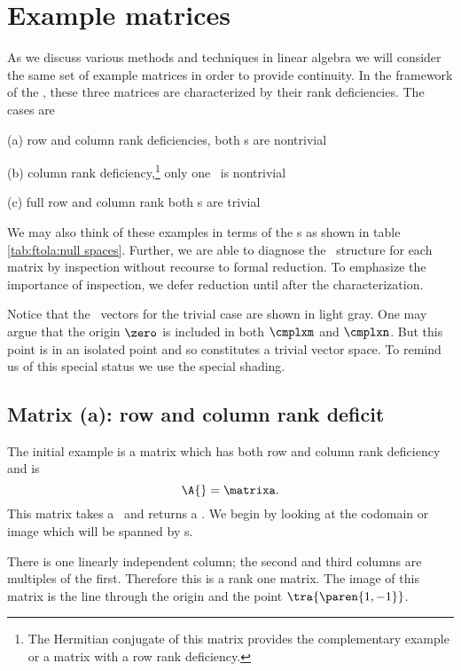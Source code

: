 \section{Example matrices}
As we discuss various methods and techniques in linear algebra we will consider the same set of example matrices in  order to provide continuity. In the framework of the \ft, these three matrices are characterized by their rank deficiencies. The cases are
%
\begin{description}
%
\item{(a)} row and column rank deficiencies,
\subitem both \ns s are nontrivial
%
\item{(b)} column rank deficiency,\footnote{The Hermitian conjugate of this matrix provides the complementary example or a matrix with a row rank deficiency.}
\subitem only one \ns \ is nontrivial
%
\item{(c)} full row and column rank
\subitem both \ns s are trivial
%
\end{description}

We may also think of these examples in terms of the \ns s as shown in table \eqref{tab:ftola:null spaces}.
Further, we are able to diagnose the \ns \ structure for each matrix by inspection without recourse to formal reduction. To emphasize the importance of inspection, we defer reduction until after the characterization.


Notice that the \ns \ vectors for the trivial case are shown in light gray. One may argue that the origin $\zero$ is included in both $\cmplxm$ and $\cmplxn$. But this point is in an isolated point and so constitutes a trivial vector space. To remind us of this special status we use the special shading.

\subsection{Matrix (a): row and column rank deficit}
The initial example is a matrix which has both row and column rank deficiency and is
\begin{equation}
  \A{} = \matrixa.
  \label{eq:matrix a}
\end{equation}
This matrix takes a \vvv \ and returns a \vv. We begin by looking at the codomain or image which will be spanned by \vv s.

There is one linearly independent column; the second and third columns are multiples of the first. Therefore this is a rank one matrix. The image of this matrix is the line through the origin and the point $\tra{\paren{1,-1}}$.

